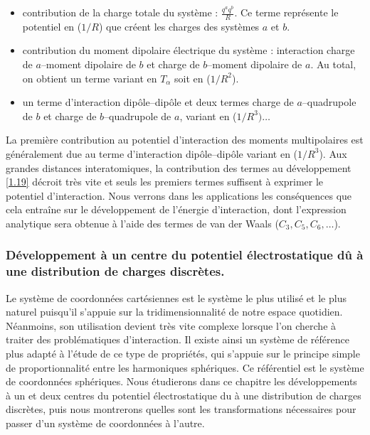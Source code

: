 	\begin{itemize}
		\item contribution de la charge totale du système : $\frac{q^{a}q^{b}}{R}$. Ce terme représente le potentiel en ($1/R$) que créent les charges des systèmes $a$ et $b$.
		\item contribution du moment dipolaire électrique du système : interaction charge de $a$--moment dipolaire de $b$ et charge de $b$--moment dipolaire de $a$. Au total, on obtient un terme variant en $T_{\alpha}$ soit en ($1/R^{2}$).	
		\item un terme d'interaction dipôle--dipôle et deux termes charge de $a$--quadrupole de $b$ et charge de $b$--quadrupole de $a$, variant en ($1/R^{3}) \ldots$
	\end{itemize}
	
	La première contribution au potentiel d'interaction des moments multipolaires est généralement due au terme d'interaction dipôle--dipôle variant en ($1/R^{3}$). Aux grandes distances interatomiques, la contribution des termes au développement \ref{1.19} décroit très vite et seuls les premiers termes suffisent à exprimer le potentiel d'interaction. Nous verrons dans les applications les conséquences que cela entraîne sur le développement de l'énergie d'interaction, dont l'expression analytique sera obtenue à l'aide des termes de van der Waals ($C_{3}, C_{5}, C_{6}, \ldots$).\\
	
	
	\subsubsection{Développement à un centre du potentiel électrostatique dû à une distribution de charges discrètes.}
	
	Le système de coordonnées cartésiennes est le système le plus utilisé et le plus naturel puisqu'il s'appuie sur la tridimensionnalité de notre espace quotidien. Néanmoins, son utilisation devient très vite complexe lorsque l'on cherche à traiter des problématiques d'interaction. Il existe ainsi un système de référence plus adapté à l'étude de ce type de propriétés, qui s'appuie sur le principe simple de proportionnalité entre les harmoniques sphériques. Ce référentiel est le système de coordonnées sphériques. Nous étudierons dans ce chapitre les développements à un et deux centres du potentiel électrostatique du à une distribution de charges discrètes, puis nous montrerons quelles sont les transformations nécessaires pour passer d'un système de coordonnées à l'autre.\\
	
